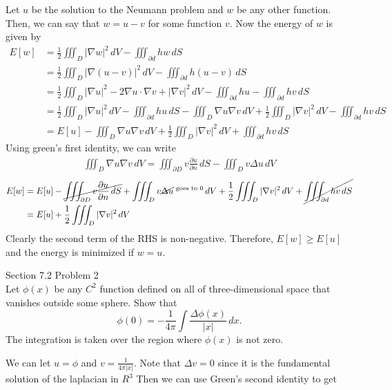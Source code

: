 \documentclass[answers,12pt,addpoints]{exam}
\begin{document}
\begin{questions}
    \begin{solution}
        Let $u$ be the solution to the Neumann problem and $w$ be any other function. Then, we can say that $w = u -v$ for some function $v$. Now the energy of $w$ is given by
        \begin{align*}
            E[w] &= \frac{1}{2} \iiint_D |\nabla w|^2 \, dV - \iiint_{\partial d} h w \, dS\\
            &= \frac{1}{2} \iiint_D |\nabla (u - v)|^2 \, dV - \iiint_{\partial d} h (u - v) \, dS\\
            &= \frac{1}{2} \iiint_D |\nabla u|^2 - 2 \nabla u \cdot \nabla v + |\nabla v|^2 \, dV - \iiint_{\partial d} h u - \iiint_{\partial d} h v \, dS\\
            &= \frac{1}{2} \iiint_D |\nabla u|^2 \, dV - \iiint_{\partial d} h u \, dS - \iiint_{D} \nabla u \nabla v \, dV + \frac{1}{2} \iiint_D |\nabla v|^2 \, dV - \iiint_{\partial d} h v \, dS\\
            &= E[u] - \iiint_{D} \nabla u \nabla v \, dV + \frac{1}{2} \iiint_D |\nabla v|^2 \, dV + \iiint_{\partial d} h v \, dS
        \end{align*}
        Using green's first identity, we can write
        \begin{align*}
            \iiint_{D} \nabla u \nabla v \, dV = \iiint_{\partial D} v \frac{\partial u}{\partial n} \, dS - \iiint_{D} v \Delta u \, dV
        \end{align*}
        \begin{align*}
            E[w] &= E[u] - \cancel{\iiint_{\partial D} v \frac{\partial u}{\partial n} \, dS} + \iiint_{D} v \cancel{\Delta u}^{\text{ goes to }0} \, dV + \frac{1}{2} \iiint_D |\nabla v|^2 \, dV + \cancel{\iiint_{\partial d} h v \, dS}\\
            &= E[u] + \frac{1}{2} \iiint_D |\nabla v|^2 \, dV
        \end{align*}
        Clearly the second term of the RHS is non-negative. Therefore, $E[w] \geq E[u]$ and the energy is minimized if $w = u$.
    \end{solution}
    \question Section 7.2 Problem 2\\
    Let $\phi(x)$ be any $C^2$ function defined on all of three-dimensional space that vanishes outside some sphere. Show that 
    $$
    \phi(0) = -\frac{1}{4\pi} \int \frac{\Delta \phi(x)}{|x|} \, dx.
    $$
    The integration is taken over the region where $\phi(x)$ is not zero.
    \begin{solution}
        We can let $u = \phi$ and $v = \frac{1}{4\pi|x|}$. Note that $\Delta v = 0$ since it is the fundamental solution of the laplacian in $R^3$ Then we can use Green's second identity to get

\end{solution}
\end{questions}
\end{document}
